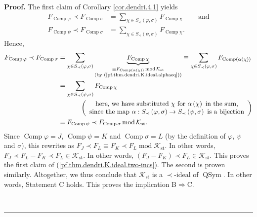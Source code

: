 \documentclass[numbers=enddot,12pt,final,onecolumn,notitlepage]{scrartcl}%
\theoremstyle{definition}
\newenvironment{proof}[1][Proof]{\noindent\textbf{#1.} }{\ \rule{0.5em}{0.5em}}
\newenvironment{verlong}{}{}
\let\sumnonlimits\sum
\renewcommand{\sum}{\sumnonlimits\limits}
\begin{document}
\begin{verlong}
\begin{proof}
The first claim of Corollary \ref{cor.dendri.4.1} yields%
\begin{align*}
F_{\operatorname*{Comp}\varphi}\left.  \prec\right.  F_{\operatorname*{Comp}%
\sigma}  &  =\sum_{\chi\in S_{\prec}\left(  \varphi,\sigma\right)
}F_{\operatorname*{Comp}\chi}\ \ \ \ \ \ \ \ \ \ \text{and}\\
F_{\operatorname*{Comp}\psi}\left.  \prec\right.  F_{\operatorname*{Comp}%
\sigma}  &  =\sum_{\chi\in S_{\prec}\left(  \psi,\sigma\right)  }%
F_{\operatorname*{Comp}\chi}.
\end{align*}
Hence,%
\begin{align*}
F_{\operatorname*{Comp}\varphi}\left.  \prec\right.  F_{\operatorname*{Comp}%
\sigma}  &  =\sum_{\chi\in S_{\prec}\left(  \varphi,\sigma\right)
}\underbrace{F_{\operatorname*{Comp}\chi}}_{\substack{\equiv
F_{\operatorname*{Comp}\left(  \alpha\left(  \chi\right)  \right)
}\operatorname{mod}\mathcal{K}_{\operatorname*{st}}\\\text{(by
(\ref{pf.thm.dendri.K.ideal.alphaeq}))}}}\equiv\sum_{\chi\in S_{\prec}\left(
\varphi,\sigma\right)  }F_{\operatorname*{Comp}\left(  \alpha\left(
\chi\right)  \right)  }\\
&  =\sum_{\chi\in S_{\prec}\left(  \psi,\sigma\right)  }%
F_{\operatorname*{Comp}\chi}\\
&  \ \ \ \ \ \ \ \ \ \ \left(
\begin{array}
[c]{c}%
\text{here, we have substituted }\chi\text{ for }\alpha\left(  \chi\right)
\text{ in the sum,}\\
\text{since the map }\alpha:S_{\prec}\left(  \varphi,\sigma\right)
\rightarrow S_{\prec}\left(  \psi,\sigma\right)  \text{ is a bijection}%
\end{array}
\right) \\
&  =F_{\operatorname*{Comp}\psi}\left.  \prec\right.  F_{\operatorname*{Comp}%
\sigma}\operatorname{mod}\mathcal{K}_{\operatorname*{st}}.
\end{align*}
Since $\operatorname*{Comp}\varphi=J$, $\operatorname*{Comp}\psi=K$ and
$\operatorname*{Comp}\sigma=L$ (by the definition of $\varphi$, $\psi$ and
$\sigma$), this rewrites as $F_{J}\left.  \prec\right.  F_{L}\equiv
F_{K}\left.  \prec\right.  F_{L}\operatorname{mod}\mathcal{K}%
_{\operatorname*{st}}$. In other words, $F_{J}\left.  \prec\right.
F_{L}-F_{K}\left.  \prec\right.  F_{L}\in\mathcal{K}_{\operatorname*{st}}$. In
other words, $\left(  F_{J}-F_{K}\right)  \left.  \prec\right.  F_{L}%
\in\mathcal{K}_{\operatorname*{st}}$. This proves the first claim of
(\ref{pf.thm.dendri.K.ideal.two-incs}). The second is proven similarly.
Altogether, we thus conclude that $\mathcal{K}_{\operatorname*{st}}$ is a
$\left.  \prec\right.  $-ideal of $\operatorname*{QSym}$. In other words,
Statement C holds. This proves the implication B$\Longrightarrow$C.


\end{proof}
\end{verlong}
\end{document}
